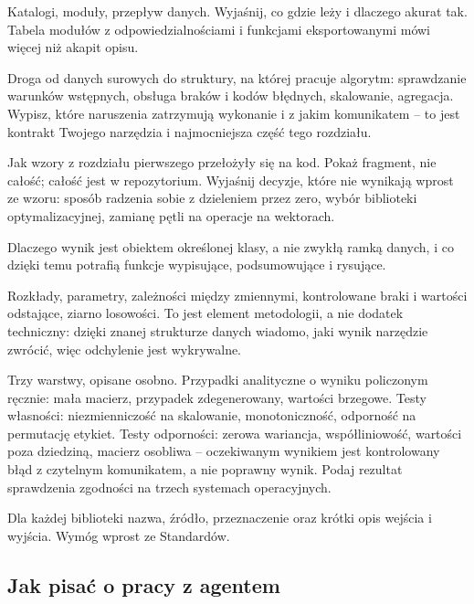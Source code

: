 Katalogi, moduły, przepływ danych. Wyjaśnij, co gdzie leży i dlaczego akurat tak. Tabela modułów z odpowiedzialnościami i funkcjami eksportowanymi mówi więcej niż akapit opisu.

 Droga od danych surowych do struktury, na której pracuje algorytm: sprawdzanie warunków wstępnych, obsługa braków i kodów błędnych, skalowanie, agregacja. Wypisz, które naruszenia zatrzymują wykonanie i z jakim komunikatem -- to jest kontrakt Twojego narzędzia i najmocniejsza część tego rozdziału.

 Jak wzory z rozdziału pierwszego przełożyły się na kod. Pokaż fragment, nie całość; całość jest w repozytorium. Wyjaśnij decyzje, które nie wynikają wprost ze wzoru: sposób radzenia sobie z dzieleniem przez zero, wybór biblioteki optymalizacyjnej, zamianę pętli na operacje na wektorach.

 Dlaczego wynik jest obiektem określonej klasy, a nie zwykłą ramką danych, i co dzięki temu potrafią funkcje wypisujące, podsumowujące i rysujące.

 Rozkłady, parametry, zależności między zmiennymi, kontrolowane braki i wartości odstające, ziarno losowości. To jest element metodologii, a nie dodatek techniczny: dzięki znanej strukturze danych wiadomo, jaki wynik narzędzie  zwrócić, więc odchylenie jest wykrywalne.

 Trzy warstwy, opisane osobno. Przypadki analityczne o wyniku policzonym ręcznie: mała macierz, przypadek zdegenerowany, wartości brzegowe. Testy własności: niezmienniczość na skalowanie, monotoniczność, odporność na permutację etykiet. Testy odporności: zerowa wariancja, współliniowość, wartości poza dziedziną, macierz osobliwa -- oczekiwanym wynikiem jest kontrolowany błąd z czytelnym komunikatem, a nie poprawny wynik. Podaj rezultat sprawdzenia zgodności na trzech systemach operacyjnych.

 Dla każdej biblioteki nazwa, źródło, przeznaczenie oraz krótki opis wejścia i wyjścia. Wymóg wprost ze Standardów.

\subsection{Jak pisać o pracy z agentem}

